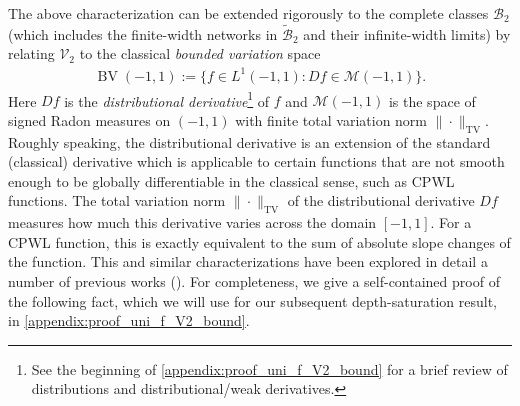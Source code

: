 \documentclass{article}
\DeclareMathOperator{\TV}{TV}
\DeclareMathOperator{\BV}{BV}
\def\cB{{\mathcal{B}}}
\def\cM{{\mathcal{M}}}
\def\cV{{\mathcal{V}}}
\begin{document}
The above characterization can be extended rigorously to the complete classes $\cB_2$ (which includes the finite-width networks in $\widetilde{\cB}_2$ and their infinite-width limits) by relating $\cV_2$ to the classical \textit{bounded variation} space
\begin{align}
    \BV(-1,1) := \{ f \in L^1(-1,1): D f \in \cM(-1,1) \}.
\end{align}
Here $Df$ is the \textit{distributional derivative}\footnote{See the beginning of \cref{appendix:proof_uni_f_V2_bound} for a brief review of distributions and distributional/weak derivatives.} of $f$ and $\cM(-1,1)$ is the space of signed Radon measures on $(-1,1)$ with finite total variation norm $\| \cdot \|_{\TV}$. Roughly speaking, the distributional derivative is an extension of the standard (classical) derivative which is applicable to certain functions that are not smooth enough to be globally differentiable in the classical sense, such as CPWL functions. The total variation norm $\| \cdot \|_{\TV}$ of the distributional derivative $Df$ measures how much this derivative varies across the domain $[-1,1]$. For a CPWL function, this is exactly equivalent to the sum of absolute slope changes of the function. This and similar characterizations have been explored in detail a number of previous works (\cite{savarese2019infinite,siegel2023characterization,wojtowytsch2022representation}). For completeness, we give a self-contained proof of the following fact, which we will use for our subsequent depth-saturation result, in \cref{appendix:proof_uni_f_V2_bound}.
\end{document}
